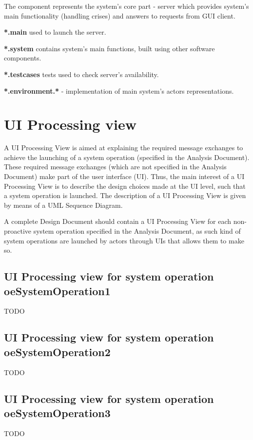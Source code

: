 The component represents the system's core part - server which provides system's
main functionality (handling crises) and answers to requests from GUI client.

\textbf{*.main} used to launch the server.

\textbf{*.system} contains system's main functions, built using other software
components.

\textbf{*.testcases} tests used to check server's availability.

\textbf{*.environment.*} - implementation of main system's actors
representations.


\section{UI Processing view}
A \gls{UI Processing View} is aimed at explaining the required message exchanges
to achieve the launching of a system operation (specified in the \msrmessir
Analysis Document). These required message exchanges (which are not specified in
the \msrmessir Analysis Document) make part of the user interface (UI). Thus, the
main interest of a UI Processing View is to describe the design choices made
at the UI level, such that a system operation is launched. The description
of a UI Processing View is given by means of a UML Sequence Diagram. 


A complete Design Document should contain a UI Processing View for each
non-proactive system operation specified in the \msrmessir Analysis Document, as
such kind of system operations are launched by actors through UIs that allows
them to make so. 



\subsection{UI Processing view for system operation oeSystemOperation1}
TODO

 
\subsection{UI Processing view for system operation oeSystemOperation2}
TODO


\subsection{UI Processing view for system operation oeSystemOperation3}
TODO





